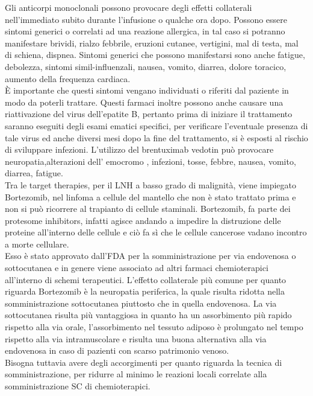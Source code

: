 Gli anticorpi monoclonali possono provocare degli effetti collaterali nell’immediato subito durante l’infusione o 
qualche ora dopo. 
Possono essere sintomi generici o correlati ad una reazione allergica, in tal caso si potranno manifestare brividi, 
rialzo febbrile, eruzioni cutanee, vertigini, mal di testa, mal di schiena, dispnea. 
Sintomi generici che possono manifestarsi sono anche  fatigue, debolezza, sintomi simil-influenzali, nausea, vomito, 
diarrea, dolore toracico, aumento della frequenza cardiaca\cite{LLSIMMUNO}.\\
È importante che questi sintomi vengano individuati o riferiti dal paziente in modo da poterli trattare.		
Questi farmaci inoltre possono anche causare una riattivazione del virus dell’epatite B, pertanto prima di iniziare 
il trattamento saranno eseguiti degli esami ematici specifici, per verificare l’eventuale presenza di tale virus ed 
anche diversi mesi dopo la fine del trattamento, si è esposti al rischio di sviluppare infezioni. 
L’utilizzo del brentuximab vedotin può provocare neuropatia,alterazioni  dell’ emocromo , infezioni, tosse, febbre, 
nausea, vomito, diarrea, fatigue\cite{IMMUNOTP}.\\

Tra le target therapies, per il LNH a basso grado di malignità, viene impiegato Bortezomib, nel linfoma a cellule del 
mantello che non è stato trattato prima e non si può ricorrere al trapianto di cellule staminali. Bortezomib, fa parte 
dei protesome inhibitors, infatti agisce andando a impedire la distruzione 
delle proteine all’interno delle cellule e ciò fa sì che le cellule cancerose vadano incontro a morte cellulare\cite{LYMPHOMACTION}.\\
Esso è stato approvato dall’FDA per la somministrazione per via endovenosa o sottocutanea e in genere viene associato 
ad altri farmaci chemioterapici all’interno di schemi terapeutici. L’effetto collaterale più comune per quanto 
riguarda Bortezomib è la neuropatia periferica, la quale risulta ridotta nella somministrazione sottocutanea piuttosto 
che in quella endovenosa. La via sottocutanea risulta più vantaggiosa in quanto ha un assorbimento più rapido rispetto 
alla via orale, l’assorbimento nel tessuto adiposo è prolungato nel tempo rispetto alla via intramuscolare e 
risulta una buona alternativa alla via endovenosa in caso di pazienti con scarso patrimonio venoso\cite{BORTEZOMIB}.\\
Bisogna tuttavia avere degli accorgimenti per quanto riguarda la tecnica di somministrazione, per ridurre al minimo 
le reazioni locali correlate alla somministrazione SC di chemioterapici.\\

